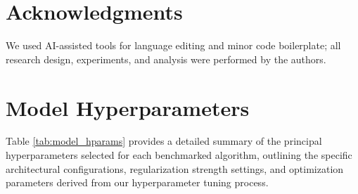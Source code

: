 \documentclass[twocolumn]{article}
\begin{document}
\section*{Acknowledgments}
We used AI-assisted tools for language editing and minor code boilerplate; all research design, experiments, and analysis were performed by the authors.

\appendix

\section{Model Hyperparameters}
\label{sec:appendix_hparams}

Table \ref{tab:model_hparams} provides a detailed summary of the principal hyperparameters selected for each benchmarked algorithm, outlining the specific architectural configurations, regularization strength settings, and optimization parameters derived from our hyperparameter tuning process.

\FloatBarrier
\end{document}
